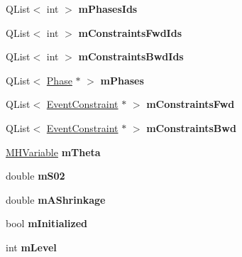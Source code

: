 \begin{DoxyCompactItemize}
\item 
\hypertarget{class_event_a500cb520b23d085b46304d145d562ed8}{Q\-List$<$ int $>$ {\bfseries m\-Phases\-Ids}}\label{class_event_a500cb520b23d085b46304d145d562ed8}

\item 
\hypertarget{class_event_a1a1b4862d75b1383e5efba622a6dac64}{Q\-List$<$ int $>$ {\bfseries m\-Constraints\-Fwd\-Ids}}\label{class_event_a1a1b4862d75b1383e5efba622a6dac64}

\item 
\hypertarget{class_event_aa69958320489c968d0c432ce81ff88bc}{Q\-List$<$ int $>$ {\bfseries m\-Constraints\-Bwd\-Ids}}\label{class_event_aa69958320489c968d0c432ce81ff88bc}

\item 
\hypertarget{class_event_a56288b4df62ef58122bec70f106a6825}{Q\-List$<$ \hyperlink{class_phase}{Phase} $\ast$ $>$ {\bfseries m\-Phases}}\label{class_event_a56288b4df62ef58122bec70f106a6825}

\item 
\hypertarget{class_event_aff85bbe78d2531d44298dcb57b538a80}{Q\-List$<$ \hyperlink{class_event_constraint}{Event\-Constraint} $\ast$ $>$ {\bfseries m\-Constraints\-Fwd}}\label{class_event_aff85bbe78d2531d44298dcb57b538a80}

\item 
\hypertarget{class_event_a31b956f1cf39412a181402058568b4aa}{Q\-List$<$ \hyperlink{class_event_constraint}{Event\-Constraint} $\ast$ $>$ {\bfseries m\-Constraints\-Bwd}}\label{class_event_a31b956f1cf39412a181402058568b4aa}

\item 
\hypertarget{class_event_a0f7169d460bc26717140bb9d0f0397bc}{\hyperlink{class_m_h_variable}{M\-H\-Variable} {\bfseries m\-Theta}}\label{class_event_a0f7169d460bc26717140bb9d0f0397bc}

\item 
\hypertarget{class_event_ad28d3483586ce6b7bff390207391260e}{double {\bfseries m\-S02}}\label{class_event_ad28d3483586ce6b7bff390207391260e}

\item 
\hypertarget{class_event_a15714ee420a2ddae1f39abdbb9e2b48a}{double {\bfseries m\-A\-Shrinkage}}\label{class_event_a15714ee420a2ddae1f39abdbb9e2b48a}

\item 
\hypertarget{class_event_a2d39136bb9fbea0a7a78b628fee95e89}{bool {\bfseries m\-Initialized}}\label{class_event_a2d39136bb9fbea0a7a78b628fee95e89}

\item 
\hypertarget{class_event_a8dd36a08b7c1ab6029bae3e29b5bda52}{int {\bfseries m\-Level}}\label{class_event_a8dd36a08b7c1ab6029bae3e29b5bda52}

\end{DoxyCompactItemize}


